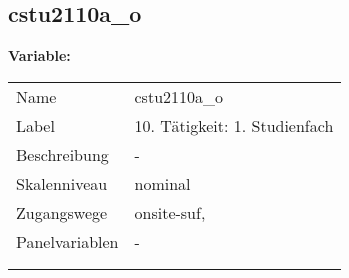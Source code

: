 	
	
	\subsection{cstu2110a\_o}
	\label{subSection:cstu2110a_o}

	\noindent\textbf{Variable:}\\
		\begin{tabular}{lL{11.3cm}}
			\label{tableVariable:cstu2110a_o}
			Name & cstu2110a\_o \\
			Label & 10. Tätigkeit: 1. Studienfach \\
			Beschreibung & - \\
			Skalenniveau & nominal \\
			Zugangswege &
				onsite-suf,
 \\
			Panelvariablen & -
			 \\
			 \\
 \\
		\end{tabular}






